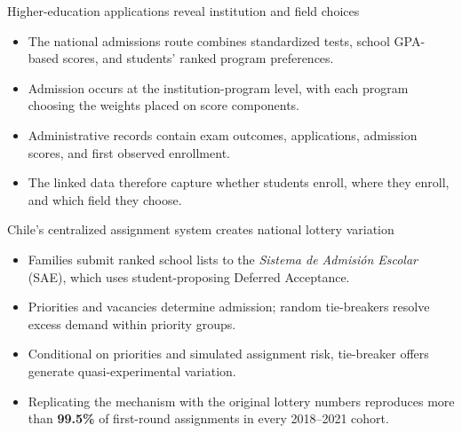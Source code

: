 \documentclass[11pt,aspectratio=169]{beamer}
\let\oldparencite\parencite
\renewcommand{\parencite}[2][]{%
  \footnotesize {\tiny \oldparencite[#1]{#2}} \normalsize%
}
\newcommand{\key}[1]{\textcolor{mDarkTeal}{\textbf{#1}}}
\newenvironment{wideitemize}{%
  \begin{minipage}{0.92\textwidth}
  \begin{itemize}
  \addtolength{\itemsep}{0.85em}
}{%
  \end{itemize}
  \end{minipage}
}
\begin{document}
\begin{frame}{Higher-education applications reveal institution and field choices}
\begin{wideitemize}
  \item The national admissions route combines standardized tests, school GPA-based scores, and students' ranked program preferences.

  \item Admission occurs at the institution-program level, with each program choosing the weights placed on score components.

  \item Administrative records contain exam outcomes, applications, admission scores, and first observed enrollment.

  \item The linked data therefore capture whether students enroll, where they enroll, and which field they choose.
\end{wideitemize}
\end{frame}



\begin{frame}{Chile's centralized assignment system creates national lottery variation}
\begin{wideitemize}
  \item Families submit ranked school lists to the \textit{Sistema de Admisi\'on Escolar} (SAE), which uses student-proposing Deferred Acceptance.

  \item Priorities and vacancies determine admission; random tie-breakers resolve excess demand within priority groups.

  \item Conditional on priorities and simulated assignment risk, tie-breaker offers generate quasi-experimental variation. \parencite{abdulkadiroglu_research_2017}

  \item Replicating the mechanism with the original lottery numbers reproduces more than \key{99.5\%} of first-round assignments in every 2018--2021 cohort.
\end{wideitemize}
\end{frame}
\end{document}
